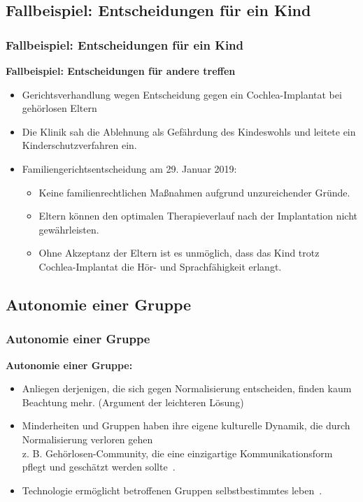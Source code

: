 \documentclass[aspectratio=169,16pt,xcolor=table]{beamer}
\begin{document}
\subsection{Fallbeispiel: Entscheidungen für ein Kind}
\begin{frame}
  \frametitle{Fallbeispiel: Entscheidungen für ein Kind}
  \textbf{Fallbeispiel: Entscheidungen für andere treffen}
  \begin{itemize}
    \item Gerichtsverhandlung wegen Entscheidung gegen ein Cochlea-Implantat bei gehörlosen Eltern~\cite{brde}
    \item Die Klinik sah die Ablehnung als Gefährdung des Kindeswohls und leitete ein Kinderschutzverfahren ein.
    \item Familiengerichtsentscheidung am 29. Januar 2019:
    \begin{itemize}
      \item Keine familienrechtlichen Maßnahmen aufgrund unzureichender Gründe.
      \item Eltern können den optimalen Therapieverlauf nach der Implantation nicht gewährleisten.
      \item Ohne Akzeptanz der Eltern ist es unmöglich, dass das Kind trotz Cochlea-Implantat die Hör- und Sprachfähigkeit erlangt.~\cite{brde}
    \end{itemize}
  \end{itemize}
\end{frame}

\subsection{Autonomie einer Gruppe}
\begin{frame}
  \frametitle{Autonomie einer Gruppe}
  \textbf{Autonomie einer Gruppe:}
  \begin{itemize}
    \item Anliegen derjenigen, die sich gegen Normalisierung entscheiden, finden kaum Beachtung mehr. (Argument der leichteren Lösung)
    \item Minderheiten und Gruppen haben ihre eigene kulturelle Dynamik, die durch Normalisierung verloren gehen\\z. B. Gehörlosen-Community, die eine einzigartige Kommunikationsform pflegt und geschätzt werden sollte~\cite{lee2016cochlear}.
    \item Technologie ermöglicht betroffenen Gruppen selbstbestimmtes leben~\cite{das2022locked}.
  \end{itemize}
\end{frame}
\end{document}
